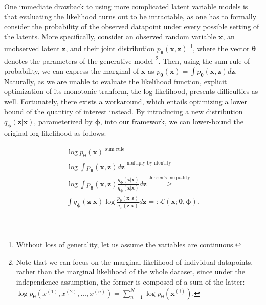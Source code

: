 \documentclass{report}
\begin{document}
\noindent One immediate drawback to using more complicated latent variable models is that evaluating the likelihood turns out to be intractable, as one has to formally consider the probability of the observed datapoint under every possible setting of the latents. More specifically, consider an observed random variable $\boldsymbol{x}$, an unobserved latent $\boldsymbol{z}$, and their joint distribution $p_{\boldsymbol{\theta}}(\boldsymbol{x}, \boldsymbol{z})$ \footnote{Without loss of generality, let us assume the variables are continuous.}, where the vector $\boldsymbol{\theta}$ denotes the parameters of the generative model \footnote{Note that we can focus on the marginal likelihood of individual datapoints, rather than the marginal likelihood of the whole dataset, since under the independence assumption, the former is composed of a sum of the latter: $\log p_{\boldsymbol{\theta}} (x^{(1)}, x^{(2)}, \dots, x^{(n)}) = \sum_{n=1}^N \log p_{\boldsymbol{\theta}} (\boldsymbol{x}^{(i)})$.}. Then, using the sum rule of probability, we can express the marginal of $\boldsymbol{x}$ as $p_{\boldsymbol{\theta}}(\boldsymbol{x}) = \int p_{\boldsymbol{\theta}}(\boldsymbol{x}, \boldsymbol{z}) d \boldsymbol{z}$. \\

\noindent Naturally, as we are unable to evaluate the likelihood function, explicit optimization of its monotonic tranform, the log-likelihood, presents difficulties as well. Fortunately, there exists a workaround, which entails optimizing a lower bound of the quantity of interest instead. By introducing a new distribution $q_{\boldsymbol{\phi}}(\boldsymbol{z} | \boldsymbol{x})$, parameterized by $\boldsymbol{\phi}$, into our framework, we can lower-bound the original log-likelihood as follows:

\begin{equation}
\begin{gathered}
\log p_{\boldsymbol{\theta}}(\boldsymbol{x}) \stackrel{\text{sum rule}}{=} \\
\log \int p_{\boldsymbol{\theta}}(\boldsymbol{x}, \boldsymbol{z}) d \boldsymbol{z} \stackrel{\text{multiply by identity}}{=} \\ 
\log \int p_{\boldsymbol{\theta}}(\boldsymbol{x}, \boldsymbol{z}) \frac{q_{\boldsymbol{\phi}}(\boldsymbol{z}|\boldsymbol{x})}{q_{\boldsymbol{\phi}}(\boldsymbol{z}|\boldsymbol{x})} d \boldsymbol{z} \stackrel{\text{Jensen's inequality}}{\geq} \\ 
\int q_{\boldsymbol{\phi}}(\boldsymbol{z}|\boldsymbol{x}) \log \frac{p_{\boldsymbol{\theta}}(\boldsymbol{x}, \boldsymbol{z})}{q_{\boldsymbol{\phi}}(\boldsymbol{z}|\boldsymbol{x})} d \boldsymbol{z} =: \mathcal{L}(\boldsymbol{x}; \boldsymbol{\theta}, \boldsymbol{\phi}). \\
\end{gathered}
\label{eq:free-energy}
\end{equation} \\
\end{document}
